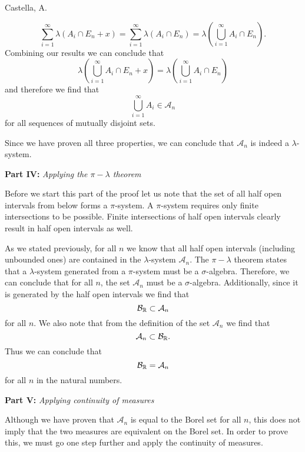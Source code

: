 \begin{solution}[3.19]{Castella, A.}
\begin{itemize}
        $$
            \sum_{i=1}^\infty \lambda(A_i \cap E_n + x) = \sum_{i=1}^\infty \lambda(A_i \cap E_n) = \lambda\left(\bigcup_{i=1}^\infty A_i\cap E_n\right).
        $$
        Combining our results we can conclude that
        $$
            \lambda\left(\bigcup_{i=1}^\infty A_i\cap E_n + x\right) = \lambda\left(\bigcup_{i=1}^\infty A_i\cap E_n\right)
        $$
        and therefore we find that
        $$
            \bigcup_{i=1}^\infty A_i \in \mathcal{A}_n
        $$
        for all sequences of mutually disjoint sets.
    \end{itemize}
    Since we have proven all three properties, we can conclude that $\mathcal{A}_n$ is indeed a $\lambda$-system.
    \vspace{0.5\baselineskip}

    \noindent\textbf{Part IV:} \textit{Applying the $\pi-\lambda$ theorem}
    
    Before we start this part of the proof let us note that the set of all half open intervals from below forms a $\pi$-system. A $\pi$-system requires only finite intersections to be possible. Finite intersections of half open intervals clearly result in half open intervals as well.
    
    As we stated previously, for all $n$ we know that all half open intervals (including unbounded ones) are contained in the $\lambda$-system $\mathcal{A}_n$. The $\pi-\lambda$ theorem states that a $\lambda$-system generated from a $\pi$-system must be a $\sigma$-algebra. Therefore, we can conclude that for all $n$, the set $\mathcal{A}_n$ must be a $\sigma$-algebra. Additionally, since it is generated by the half open intervals we find that
    $$
        \mathcal B_{\mathbb R} \subset \mathcal{A}_n
    $$
    for all $n$. We also note that from the definition of the set $\mathcal{A}_n$ we find that
    $$
        \mathcal{A}_n \subset \mathcal B_{\mathbb R}.
    $$
    Thus we can conclude that
    $$
        \mathcal B_{\mathbb R} = \mathcal{A}_n
    $$
    for all $n$ in the natural numbers.
    \vspace{0.5\baselineskip}

    \noindent\textbf{Part V:} \textit{Applying continuity of measures}
    
    Although we have proven that $\mathcal{A}_n$ is equal to the Borel set for all $n$, this does not imply that the two measures are equivalent on the Borel set. In order to prove this, we must go one step further and apply the continuity of measures.
    

\end{solution}

